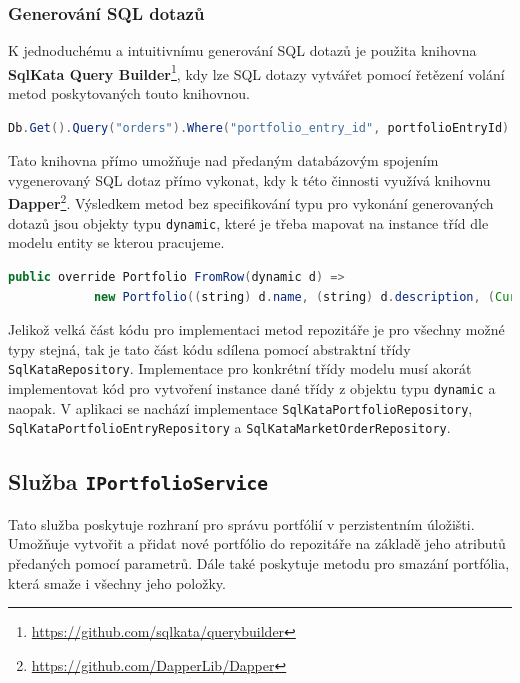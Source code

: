 \documentclass[12pt, a4paper]{article}
\begin{document}
    \subsubsection{Generování SQL dotazů}
    K jednoduchému a intuitivnímu generování SQL dotazů je použita knihovna \textbf{SqlKata Query Builder}\footnote{\url{https://github.com/sqlkata/querybuilder}}, kdy lze SQL dotazy vytvářet pomocí řetězení volání metod poskytovaných touto knihovnou.

    \begin{lstlisting}[language=Java, caption={Příklad generování SQL dotazu pro výběr všech transakcí dané položky portfólia pomocí knihovny SqlKata Query Builder.},captionpos=b, label={lst:sm-showcase}]
Db.Get().Query("orders").Where("portfolio_entry_id", portfolioEntryId).Get()
    \end{lstlisting}

    Tato knihovna přímo umožňuje nad předaným databázovým spojením vygenerovaný SQL dotaz přímo vykonat, kdy k této činnosti využívá knihovnu \textbf{Dapper}\footnote{\url{https://github.com/DapperLib/Dapper}}.
    Výsledkem metod bez specifikování typu pro vykonání generovaných dotazů jsou objekty typu \texttt{dynamic}, které je třeba mapovat na instance tříd dle modelu entity se kterou pracujeme.

    \begin{lstlisting}[language=Java,caption={Příklad mapování objektu typu \texttt{dynamic} na instanci třídy \texttt{Portfolio}.},captionpos=b, label={lst:sm-mapping}]
public override Portfolio FromRow(dynamic d) =>
            new Portfolio((string) d.name, (string) d.description, (Currency) d.currency_code, (int) d.id);
    \end{lstlisting}

    Jelikož velká část kódu pro implementaci metod repozitáře je pro všechny možné typy stejná, tak je tato část kódu sdílena pomocí abstraktní třídy \texttt{SqlKataRepository}. Implementace pro konkrétní třídy modelu musí akorát implementovat kód pro vytvoření instance dané třídy z objektu typu \texttt{dynamic} a naopak. V aplikaci se nachází implementace \texttt{SqlKataPortfolioRepository}, \texttt{SqlKataPortfolioEntryRepository} a \texttt{SqlKataMarketOrderRepository}.
    
    \subsection{Služba \texttt{IPortfolioService}}
    Tato služba poskytuje rozhraní pro správu portfólií v perzistentním úložišti.
    Umožňuje vytvořit a přidat nové portfólio do repozitáře na základě jeho atributů předaných pomocí parametrů.
    Dále také poskytuje metodu pro smazání portfólia, která smaže i všechny jeho položky.
    
\end{document}
